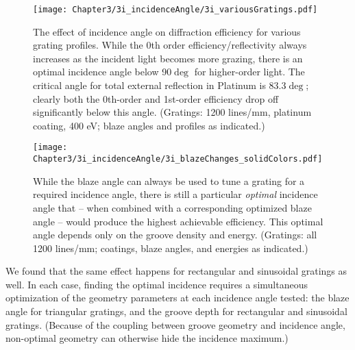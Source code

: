 \begin{figure}[htbp] %
   \centering
   \texttt{[image: Chapter3/3i\_incidenceAngle/3i\_variousGratings.pdf]} 
   \caption[The effect of incidence angle on diffraction efficiency for various grating profiles.  While the 0th order efficiency/reflectivity always increases as the incident light becomes more grazing, there is an optimal incidence angle below 90$\deg$ for higher-order light.]{The effect of incidence angle on diffraction efficiency for various grating profiles.  While the 0th order efficiency/reflectivity always increases as the incident light becomes more grazing, there is an optimal incidence angle below 90$\deg$ for higher-order light.  The critical angle for total external reflection in Platinum is 83.3$\deg$; clearly both the 0th-order and 1st-order efficiency drop off significantly below this angle. (Gratings: 1200 lines/mm, platinum coating, 400 eV; blaze angles and profiles as indicated.)}
   \label{3i}
\end{figure}

\begin{figure}[htbp] %
   \centering
   \texttt{[image: Chapter3/3i\_incidenceAngle/3i\_blazeChanges\_solidColors.pdf]} 
   \caption[While the blaze angle can always be used to tune a grating for a required incidence angle, there is still a particular \emph{optimal} incidence angle that -- when combined with a corresponding optimized blaze angle -- would produce the highest achievable efficiency.]{While the blaze angle can always be used to tune a grating for a required incidence angle, there is still a particular \emph{optimal} incidence angle that -- when combined with a corresponding optimized blaze angle -- would produce the highest achievable efficiency.  This optimal angle depends only on the groove density and energy.  (Gratings: all 1200 lines/mm; coatings, blaze angles, and energies as indicated.)}
   \label{3i-2}
\end{figure}

We found that the same effect happens for rectangular and sinusoidal gratings as well.  In each case, finding the optimal incidence requires a simultaneous optimization of the geometry parameters at each incidence angle tested: the blaze angle for triangular gratings, and the groove depth for rectangular and sinusoidal gratings.  (Because of the coupling between groove geometry and incidence angle, non-optimal geometry can otherwise hide the incidence maximum.)

